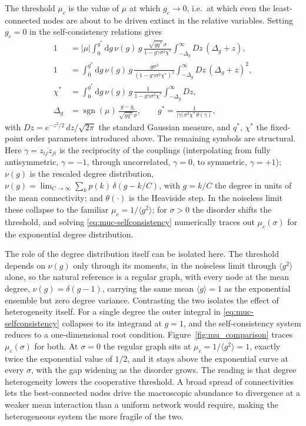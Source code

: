 The threshold $\mu_c$ is the value of $\mu$ at
which $g_c \to 0$, i.e.\ at which even the least-connected nodes are about to be
driven extinct in the relative variables. Setting $g_c = 0$ in the
self-consistency relations gives
\begin{equation}
\begin{aligned}
1 &= |\mu| \int_0^{g^*} \mathrm{d}g\, \nu(g)\, g\, \frac{\sqrt{g q^*}\, \sigma}{1 - g\gamma\sigma^2\chi^*} \int_{-\Delta_g}^{\infty} Dz\, (\Delta_g + z), \\
1 &= \int_0^{g^*} \mathrm{d}g\, \nu(g)\, g\, \frac{g\sigma^2}{(1 - g\gamma\sigma^2\chi^*)^2} \int_{-\Delta_g}^{\infty} Dz\, (\Delta_g + z)^2, \\
\chi^* &= \int_0^{g^*} \mathrm{d}g\, \nu(g)\, g\, \frac{1}{1 - g\gamma\sigma^2\chi^*} \int_{-\Delta_g}^{\infty} Dz, \\
\Delta_g &= \operatorname{sgn}(\mu)\, \frac{g - g_c}{\sqrt{g q^*}\, \sigma}, \qquad
g^* = \frac{1}{|\gamma|\, \sigma^2 \chi^*\, \theta(\gamma)},
\end{aligned}
\label{eq:muc-selfconsistency}
\end{equation}
with $Dz = e^{-z^2/2}\,dz/\sqrt{2\pi}$ the standard Gaussian measure, and
$q^\ast$, $\chi^\ast$ the fixed-point order parameters introduced above. The
remaining symbols are structural. Here $\gamma = \overline{z_{ij} z_{ji}}$ is the
reciprocity of the couplings (interpolating from fully antisymmetric,
$\gamma = -1$, through uncorrelated, $\gamma = 0$, to symmetric, $\gamma = +1$);
$\nu(g)$ is the rescaled degree distribution, $\nu(g) = \lim_{C\to\infty}
\sum_k p(k)\, \delta(g - k/C)$, with $g = k/C$ the degree in units of the mean
connectivity; and $\theta(\cdot)$ is the Heaviside step. In the
noiseless limit these collapse to the familiar $\mu_c = 1/\langle g^2 \rangle$;
for $\sigma > 0$ the disorder shifts the threshold, and solving
\eqref{eq:muc-selfconsistency} numerically traces out $\mu_c(\sigma)$ for the
exponential degree distribution.

The role of the degree distribution itself can be isolated here. The
threshold depends on $\nu(g)$ only through its moments, in the noiseless limit
through $\langle g^2 \rangle$ alone, so the natural reference is a regular
graph, with every node at the mean degree, $\nu(g) = \delta(g - 1)$, carrying the
same mean $\langle g \rangle = 1$ as the exponential ensemble but zero degree
variance. Contrasting the two isolates the effect of heterogeneity itself. For a
single degree the outer integral in \eqref{eq:muc-selfconsistency} collapses to
its integrand at $g = 1$, and the self-consistency system reduces to a
one-dimensional root condition. Figure~\ref{fig:mu_comparison} traces
$\mu_c(\sigma)$ for both. At $\sigma = 0$ the regular
graph sits at $\mu_c = 1/\langle g^2 \rangle = 1$, exactly twice the exponential
value of $1/2$, and it stays above the exponential curve at every $\sigma$, with
the gap widening as the disorder grows. The reading is that degree heterogeneity
lowers the cooperative threshold. A broad spread of connectivities lets
the best-connected nodes drive the macroscopic abundance to divergence at a
weaker mean interaction than a uniform network would require, making the
heterogeneous system the more fragile of the two.

